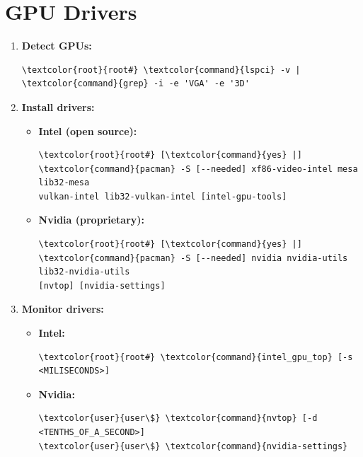 \documentclass[10pt, a4paper, onecolumn, oneside, titlepage, openany]{book}
\begin{document}
\section{GPU Drivers}
\begin{enumerate}
    \item \textbf{Detect GPUs:}
\begin{Verbatim}[commandchars=\\\{\}]
\textcolor{root}{root#} \textcolor{command}{lspci} -v | \textcolor{command}{grep} -i -e 'VGA' -e '3D'
\end{Verbatim}
    \item \textbf{Install drivers:}
    \begin{itemize}
        \item \textbf{Intel (open source):}
\begin{Verbatim}[commandchars=\\\{\}]
\textcolor{root}{root#} [\textcolor{command}{yes} |] \textcolor{command}{pacman} -S [--needed] xf86-video-intel mesa lib32-mesa 
vulkan-intel lib32-vulkan-intel [intel-gpu-tools]
\end{Verbatim}
        \item \textbf{Nvidia (proprietary):}
\begin{Verbatim}[commandchars=\\\{\}]
\textcolor{root}{root#} [\textcolor{command}{yes} |] \textcolor{command}{pacman} -S [--needed] nvidia nvidia-utils lib32-nvidia-utils 
[nvtop] [nvidia-settings]
\end{Verbatim}
    \end{itemize}
    \item \textbf{Monitor drivers:}
    \begin{itemize}
        \item \textbf{Intel:}
\begin{Verbatim}[commandchars=\\\{\}]
\textcolor{root}{root#} \textcolor{command}{intel_gpu_top} [-s <MILISECONDS>]
\end{Verbatim}
        \item \textbf{Nvidia:}
\begin{Verbatim}[commandchars=\\\{\}]
\textcolor{user}{user\$} \textcolor{command}{nvtop} [-d <TENTHS_OF_A_SECOND>]
\textcolor{user}{user\$} \textcolor{command}{nvidia-settings}
\end{Verbatim}
    \end{itemize}
\end{enumerate}
\end{document}
